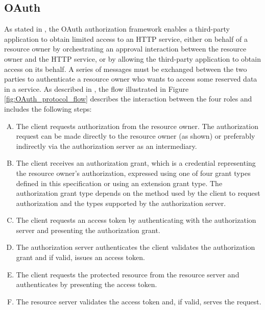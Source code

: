 \subsection{OAuth}
As stated in \cite{ietf_oauth2}, the \gls{OAuth} authorization framework enables a third-party application to obtain limited access to an HTTP service, either on behalf of a resource owner by orchestrating an approval interaction between the resource owner and the HTTP service, or by allowing the third-party application to obtain access on its behalf.
A series of messages must be exchanged between the two parties to authenticate a resource owner who wants to access some reserved data in a service. As described in \cite{ietf_oauth2}, the flow illustrated in Figure \ref{fig:OAuth_protocol_flow} describes the interaction between the four roles and includes the following steps:
\begin{enumerate}[(A)]
    \item The client requests authorization from the resource owner. The authorization request can be made directly to the resource owner (as shown) or preferably indirectly via the authorization server as an intermediary.
    \item The client receives an authorization grant, which is a credential representing the resource owner's authorization, expressed using one of four grant types defined in this specification or using an extension grant type. The authorization grant type depends on the method used by the client to request authorization and the types supported by the authorization server.
    \item The client requests an access token by authenticating with the authorization server and presenting the authorization grant.
    \item The authorization server authenticates the client validates the authorization grant and if valid, issues an access token.
    \item The client requests the protected resource from the resource server and authenticates by presenting the access token.
    \item The resource server validates the access token and, if valid, serves the request.
\end{enumerate}
 
